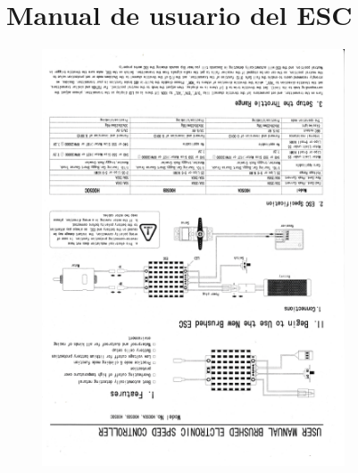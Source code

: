 \documentclass[12pt, letterpaper, oneside]{book}
\begin{document}
	\section{Manual de usuario del ESC}
	\label{sec:ESC}
	\vspace*{-1cm}
	\begin{figure}[htbp!]
		\centering
		\includegraphics[width=0.8\textwidth, angle=180]{./Figuras/001}
	\end{figure}
\end{document}
